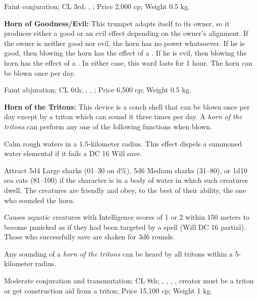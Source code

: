 Faint conjuration; CL 3rd; , ; Price 2,000 cp; Weight 0.5 kg.



\textbf{Horn of Goodness/Evil:} This trumpet adapts itself to its owner, so it produces either a good or an evil effect depending on the owner's alignment. If the owner is neither good nor evil, the horn has no power whatsoever. If he is good, then blowing the horn has the effect of a . If he is evil, then blowing the horn has the effect of a . In either case, this ward lasts for 1 hour. The horn can be blown once per day.

Faint abjuration; CL 6th; , , ; Price 6,500 cp; Weight 0.5 kg.



\textbf{Horn of the Tritons:} This device is a conch shell that can be blown once per day except by a triton which can sound it three times per day. A \emph{horn of the tritons} can perform any one of the following functions when blown.

\begin{itemize*}
\item Calm rough waters in a 1.5-kilometer radius. This effect dispels a summoned water elemental if it fails a DC 16 Will save.
\item Attract 5d4 Large sharks (01--30 on d\%), 5d6 Medium sharks (31--80), or 1d10 sea cats (81--100) if the character is in a body of water in which such creatures dwell. The creatures are friendly and obey, to the best of their ability, the one who sounded the horn.
\item Causes aquatic creatures with Intelligence scores of 1 or 2 within 150 meters to become panicked as if they had been targeted by a  spell (Will DC 16 partial). Those who successfully save are shaken for 3d6 rounds.
\end{itemize*}

Any sounding of a \emph{horn of the tritons} can be heard by all tritons within a 5-kilometer radius.

Moderate conjuration and transmutation; CL 8th; , , , , creator must be a triton or get construction aid from a triton; Price 15,100 cp; Weight 1 kg.



